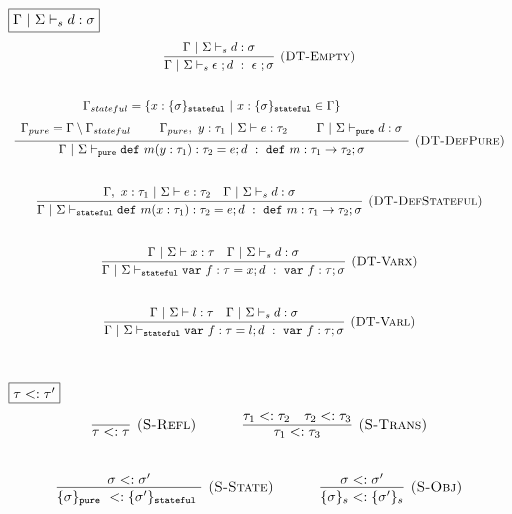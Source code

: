 \documentclass{llncs}
\newcommand{\keywadj}[1]{\mathtt{#1}}
\newcommand{\keyw}[1]{\keywadj{#1}~}
\begin{document}
$\fbox{$\Gamma~|~\Sigma \vdash_s d : \sigma$}$
\[
\begin{array}{c}

\infer[\textsc{(DT-Empty)}]
  {\Gamma~|~\Sigma \vdash_s \epsilon~; d~:~\epsilon~; \sigma}
  {\Gamma~|~\Sigma \vdash_s d : \sigma}\\[3.5ex]

\infer[\textsc{(DT-DefPure)}]
  {\Gamma~|~\Sigma \vdash_{\keywadj{pure}} \keyw{def} m(y : \tau_1) : \tau_2 = e; d~:~\keyw{def} m : \tau_1 \rightarrow \tau_2; \sigma}
  {\def\arraystretch{1.5}
  \begin{array}{c}
\Gamma_{stateful} = \{x : \{ \sigma \}_{\keywadj{stateful}} ~|~ x : \{ \sigma \}_{\keywadj{stateful}} \in \Gamma\} \\
\Gamma_{pure} = \Gamma \setminus \Gamma_{stateful}~~~~~~~\Gamma_{pure},~y : \tau_1~|~\Sigma \vdash e : \tau_2~~~~~~~\Gamma~|~\Sigma \vdash_{\keywadj{pure}} d : \sigma
  \end{array}}\\[5ex]

\infer[\textsc{(DT-DefStateful)}]
  {\Gamma~|~\Sigma \vdash_{\keywadj{stateful}} \keyw{def} m(x : \tau_1) : \tau_2 = e; d~:~\keyw{def} m : \tau_1 \rightarrow \tau_2; \sigma}
  {\Gamma,~x : \tau_1~|~\Sigma \vdash e : \tau_2 & \Gamma~|~\Sigma \vdash_s d : \sigma}\\[5ex]

\infer[\textsc{(DT-Varx)}]
  {\Gamma~|~\Sigma \vdash_{\keywadj{stateful}} \keyw{var} f : \tau = x; d~:~\keyw{var} f : \tau; \sigma}
  {\Gamma~|~\Sigma \vdash x : \tau & \Gamma~|~\Sigma \vdash_s d : \sigma}\\[5ex]

\infer[\textsc{(DT-Varl)}]
  {\Gamma~|~\Sigma \vdash_{\keywadj{stateful}} \keyw{var} f : \tau = l; d~:~\keyw{var} f : \tau; \sigma}
  {\Gamma~|~\Sigma \vdash l : \tau & \Gamma~|~\Sigma \vdash_s d : \sigma}\\[5ex]

\end{array}
\]

$\fbox{$\tau <: \tau'$}$
\[
\begin{array}{c}
\infer[\textsc{(S-Refl)}]
  {\tau <: \tau}
  {}%
~~~~~~~~~~
\infer[\textsc{(S-Trans)}]
  {\tau_1 <: \tau_3}
  {\tau_1 <: \tau_2 & \tau_2 <: \tau_3}\\[5ex]

\infer[\textsc{(S-State)}]
  {\{ \sigma \}_{\keyw{pure}} <: \{ \sigma' \}_{\keyw{stateful}}}
  {\sigma <: \sigma'}%
~~~~~~~~~~
\infer[\textsc{(S-Obj)}]
  {\{ \sigma \}_{s} <: \{ \sigma' \}_{s}}
  {\sigma <: \sigma'}\\[5ex]  

\end{array}
\]
\end{document}
